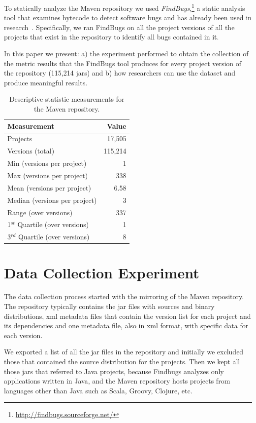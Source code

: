 \documentclass{sig-alternate}
\begin{document}
To statically analyze the Maven repository
we used {\it FindBugs},\footnote{\url{http://findbugs.sourceforge.net/}}
a static analysis tool that examines bytecode to detect software bugs
and has already been used in research~\cite{AP10,SHP06}.
Specifically, we ran FindBugs on all the project versions of all
the projects that exist in the repository
to identify all bugs contained in it.

In this paper we present: a) the experiment performed to obtain the
collection of the metric results that the FindBugs tool produces 
for every project version of the repository (115,214 {\sc jar}s)
and b) how researchers can use the dataset and produce
meaningful results.

\begin{table}
\centering
\begin{tabular}{l r}
\hline
Measurement & Value\\
 \hline
Projects & 17,505\\
Versions (total) & 115,214\\
Min (versions per project) & 1\\
Max (versions per project) & 338\\
Mean (versions per project) & 6.58\\
Median (versions per project) & 3\\
Range (over versions) & 337\\
1$^{st}$ Quartile (over versions) & 1\\
3$^{rd}$ Quartile (over versions) & 8\\
\hline
\end{tabular}
\caption{Descriptive statistic measurements for the Maven repository.}
\label{tbl:repository}
\end{table}

\section{Data Collection Experiment}
\label{sec:exp}

The data collection process started with the mirroring of the Maven repository.
The repository typically contains the {\sc jar} files with sources and binary distributions, 
{\sc xml} metadata files that contain the version list for each project and its dependencies and one 
metadata file, also in {\sc xml} format, with specific data for each version.

We exported a list of all the {\sc jar} files in the repository and initially we excluded those
that contained the source distribution for the projects. Then we kept all those {\sc jar}s that 
referred to Java projects, because Findbugs analyzes only applications written in Java,
and the Maven repository hosts projects from languages other than Java such as Scala, Groovy,
Clojure, etc. 
\end{document}
